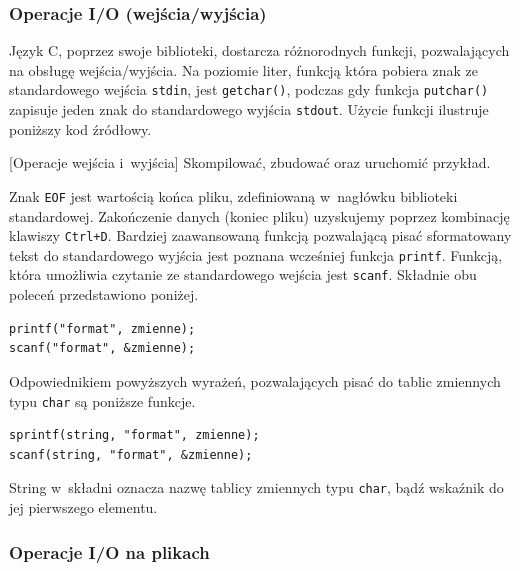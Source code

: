 \subsubsection{Operacje I/O (wejścia/wyjścia)}

Język C, poprzez swoje biblioteki, dostarcza różnorodnych funkcji, pozwalających na obsługę wejścia/wyjścia. Na poziomie liter, funkcją która pobiera znak ze standardowego wejścia \lstinline[style=MyCStyle]{stdin}, jest \lstinline[style=MyCStyle]{getchar()}, podczas gdy funkcja \lstinline[style=MyCStyle]{putchar()} zapisuje jeden znak do standardowego wyjścia \lstinline[style=MyCStyle]{stdout}. Użycie funkcji ilustruje poniższy kod źródłowy.

\begin{example}{[Operacje wejścia i~wyjścia]} Skompilować, zbudować oraz uruchomić przykład. 

\end{example}

Znak \lstinline[style=MyCStyle]{EOF} jest wartością końca pliku, zdefiniowaną w~nagłówku biblioteki standardowej. Zakończenie danych (koniec pliku) uzyskujemy poprzez kombinację klawiszy \lstinline[style=MyCStyle]{Ctrl+D}. Bardziej zaawansowaną funkcją pozwalającą pisać sformatowany tekst do standardowego wyjścia jest poznana wcześniej funkcja \lstinline[style=MyCStyle]{printf}. Funkcją, która umożliwia czytanie ze standardowego wejścia jest \lstinline[style=MyCStyle,morekeywords={scanf}]{scanf}. Składnie obu poleceń przedstawiono poniżej.

\begin{lstlisting}[style=MyCStyle,morekeywords={scanf}]
printf("format", zmienne);
scanf("format", &zmienne);
\end{lstlisting}

Odpowiednikiem powyższych wyrażeń, pozwalających pisać do tablic zmiennych typu \lstinline[style=MyCStyle]{char} są poniższe funkcje.

\begin{lstlisting}[style=MyCStyle,morekeywords={scanf,sprintf}]
sprintf(string, "format", zmienne);
scanf(string, "format", &zmienne);
\end{lstlisting}

String w~składni oznacza nazwę tablicy zmiennych typu \lstinline[style=MyCStyle]{char}, bądź wskaźnik do jej pierwszego elementu.

\subsubsection{Operacje I/O na plikach}

